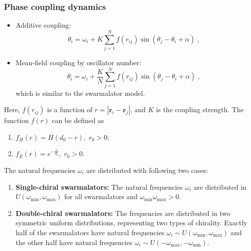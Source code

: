 \documentclass{article}
\begin{document}
\subsubsection{Phase coupling dynamics}
\begin{itemize}
    \item Additive coupling: 
    \begin{equation}
        \label{eq:additionalCouplingDotTheta}
        \dot{\theta}_i=\omega _i+K\sum_{j=1}^{N}f\left( r_{ij} \right)\sin \left( \theta _j-\theta _i+\alpha \right)\;,
    \end{equation}
    \item Mean-field coupling by oscillator number:
    \begin{equation}
        \label{eq:swarmalatorDotTheta}
        \dot{\theta}_i=\omega _i+\frac{K}{N}\sum_{j=1}^N{f}\left( r_{ij} \right) \sin \left( \theta _j-\theta _i+\alpha \right) \;,
    \end{equation}
    which is similar to the swarmalator model.
\end{itemize}
Here,  $f\left( r_{ij} \right)$ is a function of $r=\left| \mathbf{r}_i-\mathbf{r}_j \right|$, and $K$ is the coupling strength. 
The function $f\left( r \right)$ can be defined as
\begin{enumerate}
    \item $f_H\left( r \right)=H\left( d_0-r \right),\;r_0>0$;
    \item $f_E\left( r \right)=e^{-\frac{r}{d_0}},\;r_0>0$.
\end{enumerate}
The natural frequencies $\omega_i$ are distributed with following two cases:
\begin{enumerate}
    \item \textbf{Single-chiral swarmalators:} The natural frequencies $\omega_i$ are distributed in $U\left( \omega _{\min},\omega _{\max} \right)$ for all swarmalators and $\omega _{\min}\omega _{\max}>0$.
    
    \item \textbf{Double-chiral swarmalators:} The frequencies are distributed in two symmetric uniform distributions, representing two types of chirality. Exactly half of the swarmalators have natural frequencies $\omega_i \sim U\left( \omega _{\min},\omega _{\max} \right)$ and the other half have natural frequencies $\omega_i \sim U\left( -\omega _{\max},-\omega _{\min} \right)$.
\end{enumerate}
\end{document}
